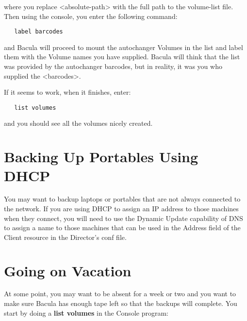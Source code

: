 where you replace {\textless}absolute-path{\textgreater} with the full path to the
volume-list file. Then using the console, you enter the following command:

\footnotesize
\begin{verbatim}
   label barcodes
\end{verbatim}
\normalsize

and Bacula will proceed to mount the autochanger Volumes in the list and label
them with the Volume names you have supplied. Bacula will think that the list
was provided by the autochanger barcodes, but in reality, it was you who
supplied the {\textless}barcodes{\textgreater}.

If it seems to work, when it finishes, enter:

\footnotesize
\begin{verbatim}
   list volumes
\end{verbatim}
\normalsize

and you should see all the volumes nicely created.

\section{Backing Up Portables Using DHCP}
\label{DNS}

You may want to backup laptops or portables that are not always connected to
the network. If you are using DHCP to assign an IP address to those machines
when they connect, you will need to use the Dynamic Update capability of DNS
to assign a name to those machines that can be used in the Address field of
the Client resource in the Director's conf file.

\section{Going on Vacation}
\label{Vacation}

At some point, you may want to be absent for a week or two and you want to
make sure Bacula has enough tape left so that the backups will complete. You
start by doing a {\bf list volumes} in the Console program:


